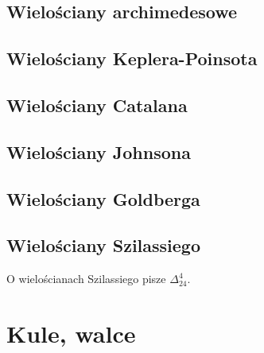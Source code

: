 
\subsection{Wielościany archimedesowe}

\subsection{Wielościany Keplera-Poinsota}


\subsection{Wielościany Catalana}


\subsection{Wielościany Johnsona}


\subsection{Wielościany Goldberga}

\subsection{Wielościany Szilassiego}
O wielościanach Szilassiego pisze $\Delta_{24}^4$.



\section{Kule, walce}
